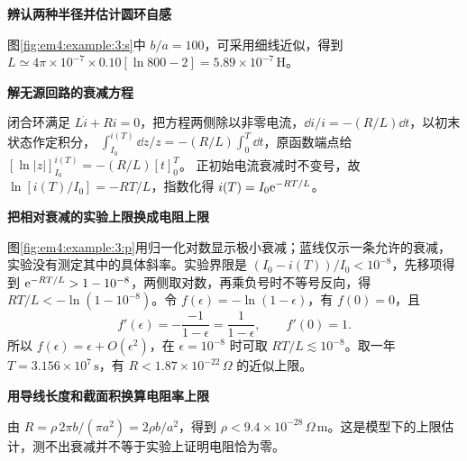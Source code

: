 \begin{solution}\textbf{辨认两种半径并估计圆环自感}\par\nobreak
图\ref{fig:em4:example:3:s}中 $b/a=100$，可采用细线近似，得到 $L\simeq4\pi\times10^{-7}\times0.10[\ln800-2]=5.89\times10^{-7}\,\mathrm H$。

\par\medskip{}\noindent\textbf{解无源回路的衰减方程}\par\nobreak
闭合环满足 $L\dot i+Ri=0$，把方程两侧除以非零电流，$\dd i/i=-(R/L)\dd t$，以初末状态作定积分，
$\int_{I_0}^{i(T)}\dd z/z=-(R/L)\int_0^T\dd t$，原函数端点给
$[\ln|z|]_{I_0}^{i(T)}=-(R/L)[t]_0^T$。
正初始电流衰减时不变号，故 $\ln[i(T)/I_0]=-RT/L$，指数化得 $i(T)=I_0\mathrm e^{-RT/L}$。



\par\medskip{}\noindent\textbf{把相对衰减的实验上限换成电阻上限}\par\nobreak
图\ref{fig:em4:example:3:p}用归一化对数显示极小衰减；蓝线仅示一条允许的衰减，实验没有测定其中的具体斜率。实验界限是 $(I_0-i(T))/I_0<10^{-8}$，先移项得到 $\mathrm e^{-RT/L}>1-10^{-8}$，两侧取对数，再乘负号时不等号反向，得 $RT/L<-\ln(1-10^{-8})$。令 $f(\epsilon)=-\ln(1-\epsilon)$，有 $f(0)=0$，且
\[
 f'(\epsilon)=-\frac{-1}{1-\epsilon}=\frac1{1-\epsilon},\qquad f'(0)=1.
\]
所以 $f(\epsilon)=\epsilon+O(\epsilon^2)$，在 $\epsilon=10^{-8}$ 时可取 $RT/L\lesssim10^{-8}$。取一年 $T=3.156\times10^7\,\mathrm s$，有 $R<1.87\times10^{-22}\,\Omega$ 的近似上限。

\par\medskip{}\noindent\textbf{用导线长度和截面积换算电阻率上限}\par\nobreak
由 $R=\rho\,2\pi b/(\pi a^2)=2\rho b/a^2$，得到 $\rho<9.4\times10^{-28}\,\Omega\,\mathrm m$。这是模型下的上限估计，测不出衰减并不等于实验上证明电阻恰为零。\end{solution}
